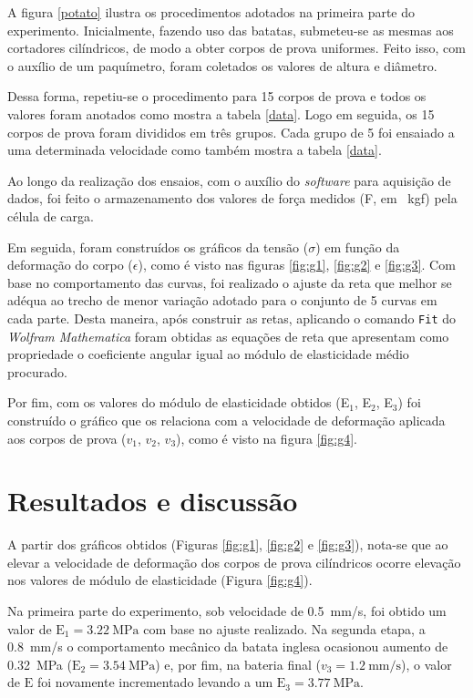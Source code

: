 \documentclass[a4paper, 12pt]{article}
\begin{document}
	A figura \ref{potato} ilustra os procedimentos adotados na primeira parte do experimento. Inicialmente, fazendo uso das batatas, submeteu-se as mesmas aos cortadores cilíndricos, de modo a obter corpos de prova uniformes. Feito isso, com o auxílio de um paquímetro, foram coletados os valores de altura e diâmetro.
	
	Dessa forma, repetiu-se o procedimento para 15 corpos de prova e todos os valores foram anotados como mostra a tabela \ref{data}. Logo em seguida, os 15 corpos de prova foram divididos em três grupos. Cada grupo de 5 foi ensaiado a uma determinada velocidade como também mostra a tabela \ref{data}.
	
	Ao longo da realização dos ensaios, com o auxílio do \textit{software} para aquisição de dados, foi feito o armazenamento dos valores de força medidos (F, em \SI{}{\kilo gf}) pela célula de carga.
	
	Em seguida, foram construídos os gráficos da tensão ($\sigma$) em função da deformação do corpo ($\epsilon$), como é visto nas figuras \ref{fig:g1}, \ref{fig:g2} e \ref{fig:g3}. Com base no comportamento das curvas, foi realizado o ajuste da reta que melhor se adéqua ao trecho de menor variação adotado para o conjunto de 5 curvas em cada parte. Desta maneira, após construir as retas, aplicando o comando \texttt{Fit} do \textit{Wolfram Mathematica} foram obtidas as equações de reta que apresentam como propriedade o coeficiente angular igual ao módulo de elasticidade médio procurado.
	
	Por fim, com os valores do módulo de elasticidade obtidos (E$_{1}$, E$_{2}$, E$_{3}$) foi construído o gráfico que os relaciona com a velocidade de deformação aplicada aos corpos de prova ($v_{1}$, $v_{2}$, $v_{3}$), como é visto na figura \ref{fig:g4}. 
	
	\section{Resultados e discussão}
	
	A partir dos gráficos obtidos (Figuras \ref{fig:g1}, \ref{fig:g2} e \ref{fig:g3}), nota-se que ao elevar a velocidade de deformação dos corpos de prova cilíndricos ocorre elevação nos valores de módulo de elasticidade (Figura \ref{fig:g4}). 
	
	Na primeira parte do experimento, sob velocidade de \SI{.5}{\milli\meter/\second}, foi obtido um valor de $\textrm{E}_{1}=\SI{3.22}{\mega\pascal}$ com base no ajuste realizado. Na segunda etapa, a \SI{.8}{\milli\meter/\second} o comportamento mecânico da batata inglesa ocasionou aumento de \SI{.32}{\mega\pascal} ($\textrm{E}_{2}=\SI{3.54}{\mega\pascal}$) e, por fim, na bateria final ($v_{3}=\SI{1.2}{\milli\meter/\second}$), o valor de $\textrm{E}$ foi novamente incrementado levando a um $\textrm{E}_{3}=\SI{3.77}{\mega\pascal}$. 
	
\end{document}
